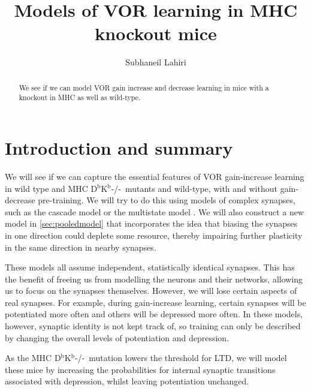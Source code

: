 \documentclass[12pt]{article}
\title{Models of VOR learning in MHC knockout mice}
\author{Subhaneil Lahiri
%
}
\newcommand{\KO}{D$^\mathrm{b}$K$^\mathrm{b}$-/-}
\begin{document}
\maketitle




\begin{abstract}
  We see if we can model VOR gain increase and decrease learning in mice with a knockout in MHC as well as wild-type.
\end{abstract}

\tableofcontents
\listoffigures


\section{Introduction and summary}\label{sec:intro}

We will see if we can capture the essential features of VOR gain-increase learning in wild type and MHC \KO\ mutants and wild-type, with and without gain-decrease pre-training.
We will try to do this using models of complex synapses, such as the cascade model \cite{Fusi2005cascade} or the multistate model \cite{amit1994learning,Fusi2007multistate}.
We will also construct a new model in \autoref{sec:pooledmodel} that incorporates the idea that biasing the synapses in one direction could deplete some resource, thereby impairing further plasticity in the same direction in nearby synapses.

These models all assume independent, statistically identical synapses.
This has the benefit of freeing us from modelling the neurons and their networks, allowing us to focus on the synapses themselves.
However, we will lose certain aspects of real synapses.
For example, during gain-increase learning, certain synapses will be potentiated more often and others will be depressed more often.
In these models, however, synaptic identity is not kept track of, so training can only be described by changing the overall levels of potentiation and depression.

As the MHC \KO\ mutation lowers the threshold for LTD, we will model these mice by increasing the probabilities for internal synaptic transitions associated with depression, whilst leaving potentiation unchanged.
\end{document}
